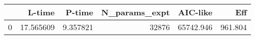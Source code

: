 \begin{tabular}{lrrrrr}
\toprule
{} &     L-time &    P-time &  N\_params\_expt &   AIC-like &      Eff \\
\midrule
0 &  17.565609 &  9.357821 &          32876 &  65742.946 &  961.804 \\
\bottomrule
\end{tabular}
